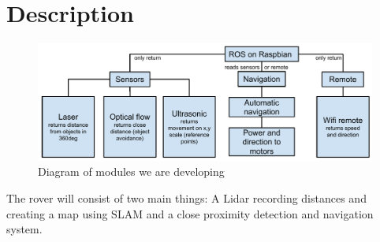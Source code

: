 \section{Description}

\begin{figure}[H]
	\centering
	\includegraphics[scale=.7]{images/developmentdiagram.pdf}
	\caption{Diagram of modules we are developing}
	\label{fig:developmentdiagram}
\end{figure}

The rover will consist of two main things: A Lidar recording distances and creating a map using SLAM and a close proximity detection and navigation system.


